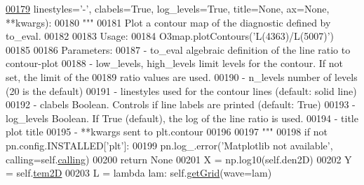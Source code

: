 \begin{DoxyCode}
\hypertarget{classpyneb_1_1core_1_1emis_grid_1_1_emis_grid_l00179}{}\hyperlink{classpyneb_1_1core_1_1emis_grid_1_1_emis_grid_ad9b2a66903f1b2e6b711c7d6dbe37dba}{00179}                       linestyles=\textcolor{stringliteral}{'-'}, clabels=\textcolor{keyword}{True}, log\_levels=\textcolor{keyword}{True}, title=\textcolor{keywordtype}{None}, ax=\textcolor{keywordtype}{None}, **kwargs):
00180         \textcolor{stringliteral}{"""}
00181 \textcolor{stringliteral}{        Plot a contour map of the diagnostic defined by to\_eval.}
00182 \textcolor{stringliteral}{        }
00183 \textcolor{stringliteral}{        Usage:}
00184 \textcolor{stringliteral}{            O3map.plotContours('L(4363)/L(5007)')}
00185 \textcolor{stringliteral}{        }
00186 \textcolor{stringliteral}{        Parameters:}
00187 \textcolor{stringliteral}{            - to\_eval                   algebraic definition of the line ratio to contour-plot}
00188 \textcolor{stringliteral}{            - low\_levels, high\_levels   limit levels for the contour. If not set, the limit of the }
00189 \textcolor{stringliteral}{                                        ratio values are used.}
00190 \textcolor{stringliteral}{            - n\_levels                  number of levels (20 is the default)}
00191 \textcolor{stringliteral}{            - linestyles                used for the contour lines (default: solid line)}
00192 \textcolor{stringliteral}{            - clabels                   Boolean. Controls if line labels are printed (default: True)}
00193 \textcolor{stringliteral}{            - log\_levels                Boolean. If True (default), the log of the line ratio is used.}
00194 \textcolor{stringliteral}{            - title                     plot title}
00195 \textcolor{stringliteral}{            - **kwargs                  sent to plt.contour}
00196 \textcolor{stringliteral}{            }
00197 \textcolor{stringliteral}{        """} 
00198         \textcolor{keywordflow}{if} \textcolor{keywordflow}{not} pn.config.INSTALLED[\textcolor{stringliteral}{'plt'}]:
00199             pn.log\_.error(\textcolor{stringliteral}{'Matplotlib not available'}, calling=self.\hyperlink{classpyneb_1_1core_1_1emis_grid_1_1_emis_grid_a19820878261ee98513e0b755e688453f}{calling})
00200             \textcolor{keywordflow}{return} \textcolor{keywordtype}{None}
00201         X = np.log10(self.den2D)
00202         Y = self.\hyperlink{classpyneb_1_1core_1_1emis_grid_1_1_emis_grid_ae1904aecb62ca67772b3998cca09fabd}{tem2D}
00203         L = \textcolor{keyword}{lambda} lam: self.\hyperlink{classpyneb_1_1core_1_1emis_grid_1_1_emis_grid_af9a9219e5ddfcfd53c52466e2c2deb44}{getGrid}(wave=lam)

\end{DoxyCode}
